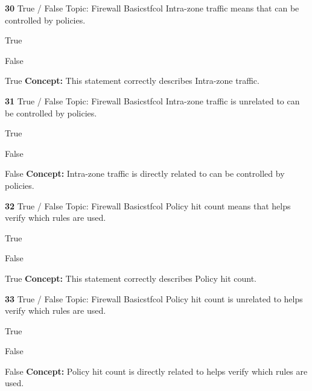 \documentclass[10pt,a4paper]{article}
\begin{document}
\begin{qcard}{\color{white}\textbf{30} \hfill \small True / False \textbar{} Topic: Firewall Basics}{tfcol}
Intra-zone traffic means that can be controlled by policies.

\begin{qoptions}
\item True
\item False
\end{qoptions}
\begin{explainbox}{True}
\textbf{Concept:} This statement correctly describes Intra-zone traffic.
\end{explainbox}
\end{qcard}

\begin{qcard}{\color{white}\textbf{31} \hfill \small True / False \textbar{} Topic: Firewall Basics}{tfcol}
Intra-zone traffic is unrelated to can be controlled by policies.

\begin{qoptions}
\item True
\item False
\end{qoptions}
\begin{explainbox}{False}
\textbf{Concept:} Intra-zone traffic is directly related to can be controlled by policies.
\end{explainbox}
\end{qcard}

\begin{qcard}{\color{white}\textbf{32} \hfill \small True / False \textbar{} Topic: Firewall Basics}{tfcol}
Policy hit count means that helps verify which rules are used.

\begin{qoptions}
\item True
\item False
\end{qoptions}
\begin{explainbox}{True}
\textbf{Concept:} This statement correctly describes Policy hit count.
\end{explainbox}
\end{qcard}

\begin{qcard}{\color{white}\textbf{33} \hfill \small True / False \textbar{} Topic: Firewall Basics}{tfcol}
Policy hit count is unrelated to helps verify which rules are used.

\begin{qoptions}
\item True
\item False
\end{qoptions}
\begin{explainbox}{False}
\textbf{Concept:} Policy hit count is directly related to helps verify which rules are used.
\end{explainbox}
\end{qcard}
\end{document}
